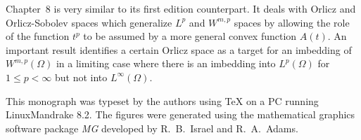 Chapter~8 is very similar to its first edition counterpart. It deals with Orlicz and 
Orlicz-Sobolev spaces which generalize $L^p$ and $W^{m, p}$ spaces by allowing the role of 
the function $t^p$ to be assumed by a more general convex function $A(t)$. An important result 
identifies a certain Orlicz space as a target for an imbedding of $W^{m, p}(\Omega)$ in a limiting 
case where there is an imbedding into $L^p(\Omega)$ for $1 \leq p<\infty$
but not into $L^{\infty}(\Omega)$.

This monograph was typeset by the authors using \TeX{} on
a PC running LinuxMandrake 8.2. The figures were generated using the mathematical 
graphics software package \textit{MG} developed by R.~B.~Israel and R.~A.~Adams.